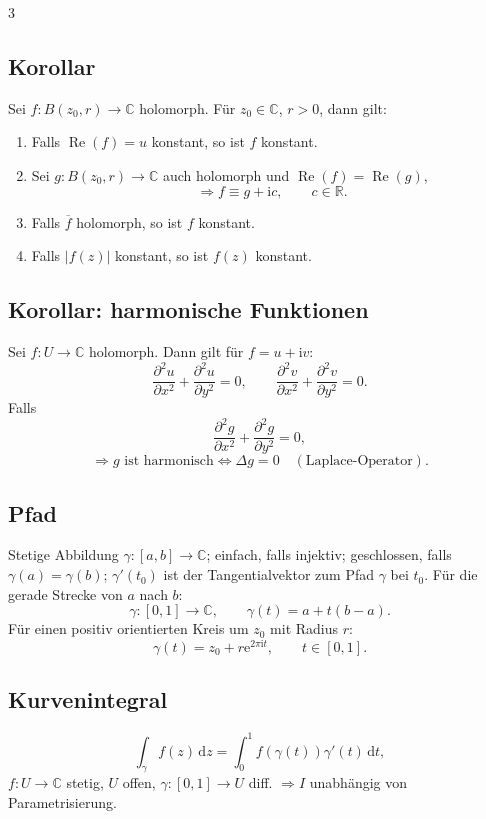 \documentclass[a4paper,landscape]{article}
\newcommand{\C}{\mathbb C}
\newcommand{\R}{\mathbb R}
\newcommand{\dd}{\,\mathrm d}
\newcommand{\ee}{\mathrm e}
\newcommand{\ii}{\mathrm i}
\begin{document}
\begin{multicols*}{3}
\subsection*{Korollar}
Sei $f:B(z_0,r)\to\C$ holomorph. Für $z_0\in\C$, $r>0$, dann gilt:
\begin{enumerate}[label=(\roman*)]
\item Falls $\operatorname{Re}(f)=u$ konstant, so ist $f$ konstant.
\item Sei $g:B(z_0,r)\to\C$ auch holomorph und $\operatorname{Re}(f)=\operatorname{Re}(g)$,
\[
\Rightarrow f\equiv g+\ii c,\qquad c\in\R.
\]
\item Falls $\overline f$ holomorph, so ist $f$ konstant.
\item Falls $|f(z)|$ konstant, so ist $f(z)$ konstant.
\end{enumerate}

\subsection*{Korollar: harmonische Funktionen}
Sei $f:U\to\C$ holomorph. Dann gilt für $f=u+\ii v$:
\[
\frac{\partial^2u}{\partial x^2}+\frac{\partial^2u}{\partial y^2}=0,\qquad
\frac{\partial^2v}{\partial x^2}+\frac{\partial^2v}{\partial y^2}=0.
\]
Falls
\[
\frac{\partial^2g}{\partial x^2}+\frac{\partial^2g}{\partial y^2}=0,
\]
\[
\Rightarrow g\text{ ist harmonisch}\Leftrightarrow \Delta g=0\quad(\text{Laplace-Operator}).
\]

\subsection*{Pfad}
Stetige Abbildung $\gamma:[a,b]\to\C$; einfach, falls injektiv; geschlossen, falls $\gamma(a)=\gamma(b)$; $\gamma'(t_0)$ ist der Tangentialvektor zum Pfad $\gamma$ bei $t_0$.
Für die gerade Strecke von $a$ nach $b$:
\[
\gamma:[0,1]\to\C,
\qquad \gamma(t)=a+t(b-a).
\]
Für einen positiv orientierten Kreis um $z_0$ mit Radius $r$:
\[
\gamma(t)=z_0+r\ee^{2\pi\ii t},\qquad t\in[0,1].
\]

\subsection*{Kurvenintegral}
\[
\int_\gamma f(z)\dd z=\int_0^1 f(\gamma(t))\gamma'(t)\dd t,
\]
$f:U\to\C$ stetig, $U$ offen, $\gamma:[0,1]\to U$ diff. $\Rightarrow I$ unabhängig von Parametrisierung.


\end{multicols*}
\end{document}
